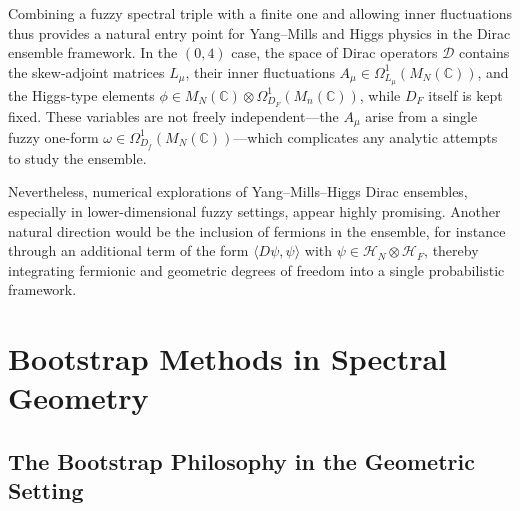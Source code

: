 \documentclass[11pt]{article}
\theoremstyle{plain}
\begin{document}
\medskip


Combining a fuzzy spectral triple with a finite one and allowing inner fluctuations thus
provides a natural entry point for Yang--Mills and Higgs physics in the Dirac ensemble
framework.  
In the $(0,4)$ case, the space of Dirac operators $\mathcal{D}$ contains the skew-adjoint
matrices $L_\mu$, their inner fluctuations
$A_\mu \in \Omega^1_{L_\mu}(M_N(\mathbb{C}))$, and the Higgs-type elements
$\phi \in M_N(\mathbb{C}) \otimes \Omega^1_{D_F}(M_n(\mathbb{C}))$, while $D_F$ itself is
kept fixed.  
These variables are not freely independent---the $A_\mu$ arise from a single fuzzy one-form
$\omega \in \Omega^1_{D_f}(M_N(\mathbb{C}))$—which complicates any analytic attempts to study
the ensemble.

Nevertheless, numerical explorations of Yang--Mills--Higgs Dirac ensembles, especially in
lower-dimensional fuzzy settings, appear highly promising.  
Another natural direction would be the inclusion of fermions in the ensemble, for instance
through an additional term of the form $\langle D\psi, \psi \rangle$ with 
$\psi \in \mathcal{H}_N \otimes \mathcal{H}_F$, thereby integrating fermionic and geometric
degrees of freedom into a single probabilistic framework.





\section{Bootstrap Methods in Spectral Geometry}


\subsection{The Bootstrap Philosophy in the Geometric Setting}

\end{document}
